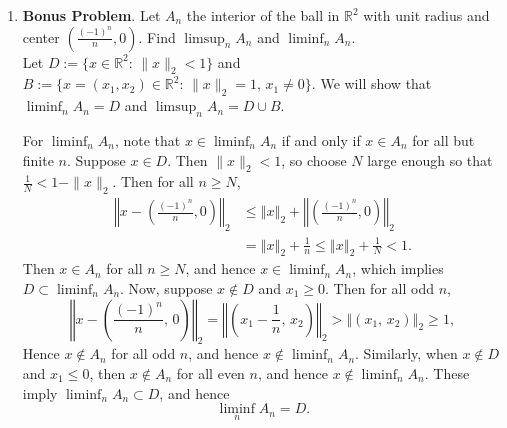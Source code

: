 \documentclass[12pt]{article}
\begin{document}
\begin{enumerate}
\begin{enumerate}
\item {\bf Bonus Problem}. Let $A_n$ the interior of the ball in $\mathbb{R}^2$ with unit radius and center $\left(\frac{{(-1)}^n}{n},0\right)$.  Find $\limsup_n A_n$ and $\liminf_n A_n$.\\
\color{blue}
Let $D:=\{x\in\mathbb{R}^{2}:\,\|x\|_{2}<1\}$ and $B:=\{x=(x_{1},x_{2})\in\mathbb{R}^{2}:\,\|x\|_{2}=1,\,x_{1}\neq0\}$.
We will show that $\liminf_{n}A_{n}=D$ and $\limsup_{n}A_{n}=D\cup B$.

For $\liminf_{n}A_{n}$, note that $x\in\liminf_{n}A_{n}$ if and
only if $x\in A_{n}$ for all but finite $n$. Suppose $x\in D$.
Then $\|x\|_{2}<1$, so choose $N$ large enough so that $\frac{1}{N}<1-\|x\|_{2}$.
Then for all $n\geq N$,
\begin{align*}
\left\Vert x-\left(\frac{(-1)^{n}}{n},0\right)\right\Vert _{2} & \leq\left\Vert x\right\Vert _{2}+\left\Vert \left(\frac{(-1)^{n}}{n},0\right)\right\Vert _{2}\\
& =\left\Vert x\right\Vert _{2}+\frac{1}{n}\leq\left\Vert x\right\Vert _{2}+\frac{1}{N}<1.
\end{align*}
Then $x\in A_{n}$ for all $n\geq N$, and hence $x\in\liminf_{n}A_{n}$,
which implies $D\subset\liminf_{n}A_{n}$. Now, suppose $x\notin D$
and $x_{1}\geq0$. Then for all odd $n$, 
\[
\left\Vert x-\left(\frac{(-1)^{n}}{n},\,0\right)\right\Vert _{2}=\left\Vert \left(x_{1}-\frac{1}{n},\,x_{2}\right)\right\Vert _{2}>\left\Vert \left(x_{1},\,x_{2}\right)\right\Vert _{2}\geq1,
\]
Hence $x\notin A_{n}$ for all odd $n$, and hence $x\notin\liminf_{n}A_{n}$.
Similarly, when $x\notin D$ and $x_{1}\leq0$, then $x\notin A_{n}$
for all even $n$, and hence $x\notin\liminf_{n}A_{n}$. These imply
$\liminf_{n}A_{n}\subset D$, and hence 
\[
\liminf_{n}A_{n}=D.
\]


\end{enumerate}
\end{enumerate}
\end{document}

